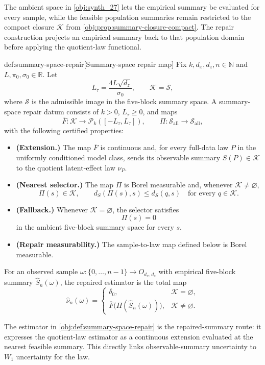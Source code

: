 The ambient space in \cref{obj:synth_27} lets the empirical summary be evaluated for every sample, while the feasible population summaries remain restricted to the compact closure \(\mathcal K\) from \cref{obj:prop:summary-closure-compact}. The repair construction projects an empirical summary back to that population domain before applying the quotient-law functional.

\begin{algorithmv}{def:summary-space-repair}[Summary-space repair map]
Fix \(k,d_x,d_z,n\in\mathbb N\) and \(L,\pi_0,\sigma_0\in\mathbb R\). Let
\[
L_\tau=\frac{4L\sqrt{d_z}}{\sigma_0},
\qquad
\mathcal K=\overline{\mathscr S},
\]
where \(\mathscr S\) is the admissible image in the five-block summary space. A summary-space repair datum consists of \(k>0\), \(L_\tau\ge 0\), and maps
\[
\overline F:\mathcal K\to \mathcal P_k([-L_\tau,L_\tau]),
\qquad
\Pi:\mathscr S_{\mathrm{all}}\to \mathscr S_{\mathrm{all}},
\]
with the following certified properties:
\begin{itemize}
\item \textbf{(Extension.)} The map \(\overline F\) is continuous and, for every full-data law \(P\) in the uniformly conditioned model class, sends its observable summary \(S(P)\in\mathcal K\) to the quotient latent-effect law \(\nu_P\).
\item \textbf{(Nearest selector.)} The map \(\Pi\) is Borel measurable and, whenever \(\mathcal K\ne\varnothing\),
\[
\Pi(s)\in\mathcal K,
\qquad
d_S(\Pi(s),s)\le d_S(q,s)\quad\text{for every }q\in\mathcal K .
\]
\item \textbf{(Fallback.)} Whenever \(\mathcal K=\varnothing\), the selector satisfies
\[
\Pi(s)=0
\]
in the ambient five-block summary space for every \(s\).
\item \textbf{(Repair measurability.)} The sample-to-law map defined below is Borel measurable.
\end{itemize}
For an observed sample \(\omega:\{0,\ldots,n-1\}\to O_{d_x,d_z}\) with empirical five-block summary \(\widehat S_n(\omega)\), the repaired estimator is the total map
\[
\widehat\nu_n(\omega)=
\begin{cases}
\delta_0, & \mathcal K=\varnothing,\\
\overline F\bigl(\Pi(\widehat S_n(\omega))\bigr), & \mathcal K\ne\varnothing .
\end{cases}
\]
\end{algorithmv}

The estimator in \cref{obj:def:summary-space-repair} is the repaired-summary route: it expresses the quotient-law estimator as a continuous extension evaluated at the nearest feasible summary. This directly links observable-summary uncertainty to \(W_1\) uncertainty for the law.

